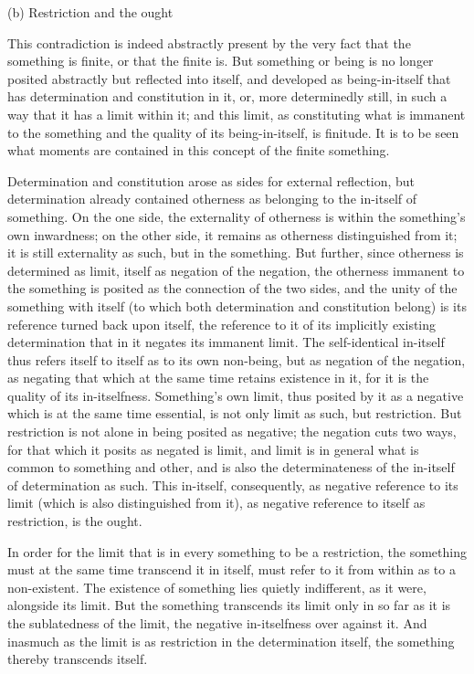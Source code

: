 (b) Restriction and the ought

This contradiction is indeed abstractly present
by the very fact that the something is finite,
or that the finite is.
But something or being is no longer posited abstractly
but reflected into itself,
and developed as being-in-itself
that has determination and constitution in it,
or, more determinedly still, in such a way
that it has a limit within it;
and this limit, as constituting
what is immanent to the something
and the quality of its being-in-itself,
is finitude.
It is to be seen what moments are contained
in this concept of the finite something.

Determination and constitution arose as
sides for external reflection,
but determination already contained otherness
as belonging to the in-itself of something.
On the one side, the externality of otherness is
within the something's own inwardness;
on the other side, it remains as otherness distinguished from it;
it is still externality as such, but in the something.
But further, since otherness is determined as limit,
itself as negation of the negation,
the otherness immanent to the something is posited as the
connection of the two sides,
and the unity of the something with itself
(to which both determination and constitution belong)
is its reference turned back upon itself,
the reference to it of its implicitly existing determination
that in it negates its immanent limit.
The self-identical in-itself thus refers
itself to itself as to its own non-being,
but as negation of the negation,
as negating that which at the same time retains existence in it,
for it is the quality of its in-itselfness.
Something's own limit, thus posited by it as a
negative which is at the same time essential,
is not only limit as such, but restriction.
But restriction is not alone in being posited as negative;
the negation cuts two ways, for that which it posits as negated is limit,
and limit is in general what is common to something and other,
and is also the determinateness of the in-itself of determination as such.
This in-itself, consequently, as negative reference to its limit
(which is also distinguished from it),
as negative reference to itself as restriction,
is the ought.

In order for the limit that is in every something to be a restriction,
the something must at the same time transcend it in itself,
must refer to it from within as to a non-existent.
The existence of something lies quietly indifferent,
as it were, alongside its limit.
But the something transcends its limit only
in so far as it is the sublatedness of the limit,
the negative in-itselfness over against it.
And inasmuch as the limit is as restriction
in the determination itself,
the something thereby transcends itself.


